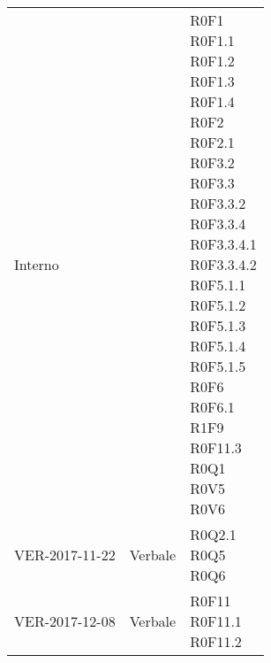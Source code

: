 \documentclass[AnalisiDeiRequisiti.tex]{subfiles}
\begin{document}
\begin{longtable}[H]{p{2cm}p{5cm}p{5cm}}
	Interno & &  \makecell[tl]{ R0F1 \\
	 R0F1.1 \\
	 R0F1.2 \\
	 R0F1.3 \\
	 R0F1.4 \\
	 R0F2 \\
	 R0F2.1 \\
	 R0F3.2 \\
	 R0F3.3 \\
	 R0F3.3.2 \\
	 R0F3.3.4 \\
	 R0F3.3.4.1 \\
	 R0F3.3.4.2 \\
	 R0F5.1.1 \\
	 R0F5.1.2 \\
	 R0F5.1.3 \\
	 R0F5.1.4 \\
	 R0F5.1.5 \\
	 R0F6 \\
	 R0F6.1 \\
	 R1F9 \\
	 R0F11.3 \\
	 R0Q1 \\
	 R0V5 \\
	 R0V6 } \\  
	
	VER-2017-11-22 & Verbale &  \makecell[tl]{ R0Q2.1 \\
	 R0Q5 \\
	 R0Q6 } \\  
	
	VER-2017-12-08 & Verbale & \makecell[tl]{ R0F11 \\
	 R0F11.1 \\
	 R0F11.2 } \\  
	

\end{longtable}
\end{document}
